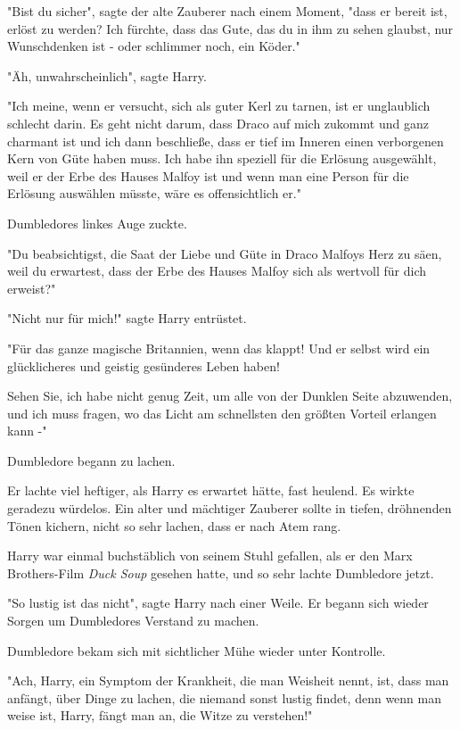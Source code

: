 {"Bist du sicher", sagte der alte Zauberer nach einem Moment, "dass er bereit ist, erlöst zu werden? Ich fürchte, dass das Gute, das du in ihm zu sehen glaubst, nur Wunschdenken ist - oder schlimmer noch, ein Köder."

"Äh, unwahrscheinlich", sagte Harry.

"Ich meine, wenn er versucht, sich als guter Kerl zu tarnen, ist er unglaublich schlecht darin. Es geht nicht darum, dass Draco auf mich zukommt und ganz charmant ist und ich dann beschließe, dass er tief im Inneren einen verborgenen Kern von Güte haben muss. Ich habe ihn speziell für die Erlösung ausgewählt, weil er der Erbe des Hauses Malfoy ist und wenn man eine Person für die Erlösung auswählen müsste, wäre es offensichtlich er."

Dumbledores linkes Auge zuckte.

"Du beabsichtigst, die Saat der Liebe und Güte in Draco Malfoys Herz zu säen, weil du erwartest, dass der Erbe des Hauses Malfoy sich als wertvoll für dich erweist?"

"Nicht nur für mich!" sagte Harry entrüstet.

"Für das ganze magische Britannien, wenn das klappt! Und er selbst wird ein glücklicheres und geistig gesünderes Leben haben!

Sehen Sie, ich habe nicht genug Zeit, um alle von der Dunklen Seite abzuwenden, und ich muss fragen, wo das Licht am schnellsten den größten Vorteil erlangen kann -"

Dumbledore begann zu lachen.

Er lachte viel heftiger, als Harry es erwartet hätte, fast heulend. Es wirkte geradezu würdelos. Ein alter und mächtiger Zauberer sollte in tiefen, dröhnenden Tönen kichern, nicht so sehr lachen, dass er nach Atem rang.

Harry war einmal buchstäblich von seinem Stuhl gefallen, als er den Marx Brothers-Film \emph{Duck Soup} gesehen hatte, und so sehr lachte Dumbledore jetzt.

"So lustig ist das nicht", sagte Harry nach einer Weile. Er begann sich wieder Sorgen um Dumbledores Verstand zu machen.

Dumbledore bekam sich mit sichtlicher Mühe wieder unter Kontrolle.

"Ach, Harry, ein Symptom der Krankheit, die man Weisheit nennt, ist, dass man anfängt, über Dinge zu lachen, die niemand sonst lustig findet, denn wenn man weise ist, Harry, fängt man an, die Witze zu verstehen!"

}
